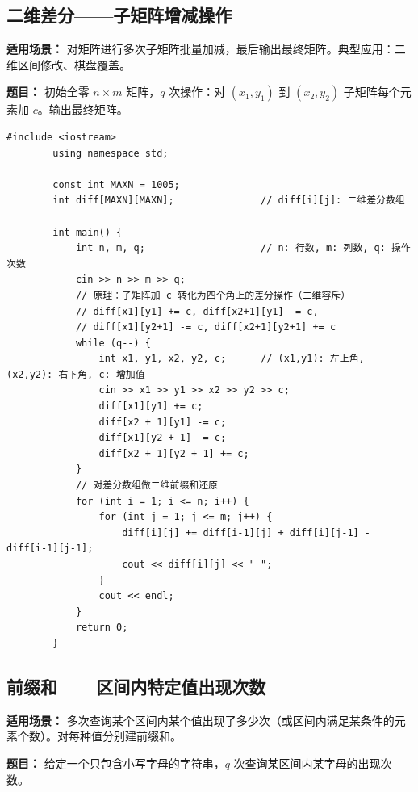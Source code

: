 \documentclass[12pt,a4paper]{ctexart}
\begin{document}
	\subsection{二维差分——子矩阵增减操作}
	\textbf{适用场景：} 对矩阵进行多次子矩阵批量加减，最后输出最终矩阵。典型应用：二维区间修改、棋盘覆盖。
	
	\textbf{题目：} 初始全零 \(n\times m\) 矩阵，\(q\) 次操作：对 \((x_1,y_1)\) 到 \((x_2,y_2)\) 子矩阵每个元素加 \(c\)。输出最终矩阵。
	
	\begin{lstlisting}[caption={二维差分——O(1) 子矩阵增减}]
		#include <iostream>
		using namespace std;
		
		const int MAXN = 1005;
		int diff[MAXN][MAXN];               // diff[i][j]: 二维差分数组
		
		int main() {
			int n, m, q;                    // n: 行数, m: 列数, q: 操作次数
			cin >> n >> m >> q;
			// 原理：子矩阵加 c 转化为四个角上的差分操作（二维容斥）
			// diff[x1][y1] += c, diff[x2+1][y1] -= c,
			// diff[x1][y2+1] -= c, diff[x2+1][y2+1] += c
			while (q--) {
				int x1, y1, x2, y2, c;      // (x1,y1): 左上角, (x2,y2): 右下角, c: 增加值
				cin >> x1 >> y1 >> x2 >> y2 >> c;
				diff[x1][y1] += c;
				diff[x2 + 1][y1] -= c;
				diff[x1][y2 + 1] -= c;
				diff[x2 + 1][y2 + 1] += c;
			}
			// 对差分数组做二维前缀和还原
			for (int i = 1; i <= n; i++) {
				for (int j = 1; j <= m; j++) {
					diff[i][j] += diff[i-1][j] + diff[i][j-1] - diff[i-1][j-1];
					cout << diff[i][j] << " ";
				}
				cout << endl;
			}
			return 0;
		}
	\end{lstlisting}
	
	\subsection{前缀和——区间内特定值出现次数}
	\textbf{适用场景：} 多次查询某个区间内某个值出现了多少次（或区间内满足某条件的元素个数）。对每种值分别建前缀和。
	
	\textbf{题目：} 给定一个只包含小写字母的字符串，\(q\) 次查询某区间内某字母的出现次数。
	
\end{document}
